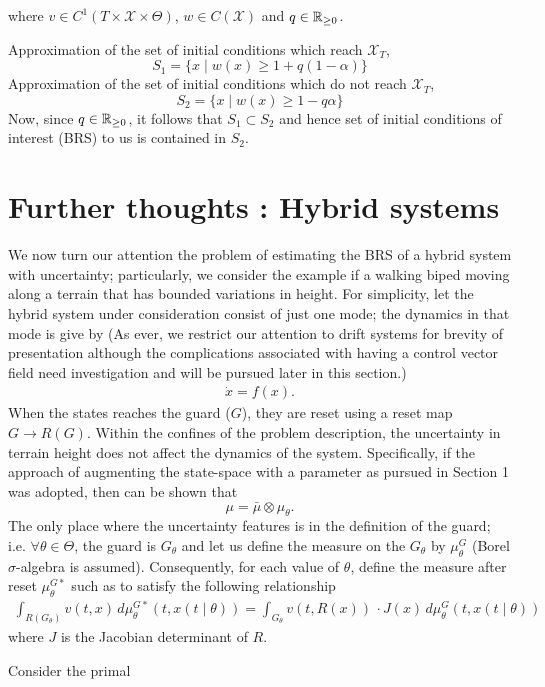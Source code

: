 \documentclass[10pt]{scrartcl}
\theoremstyle{remark}
\providecommand{\R}{\ensuremath \mathbb{R}}
\begin{document}
where $v\in C^1(T\times \mathcal X\times \Theta)$, $w\in C(\mathcal X)$ and $q\in \R_{\ge 0}$.\par
Approximation of the set of initial conditions which reach $\mathcal X_T$, 
$$S_1=\{x\mid w(x)\ge 1+q(1-\alpha)\}$$
Approximation of the set of initial conditions which do not reach $\mathcal X_T$, 
$$S_2=\{x\mid w(x)\ge 1-q\alpha\}$$
Now, since $q\in \R_{\ge 0}$, it follows that $S_1\subset S_2$ and hence set of initial conditions of interest (BRS) to us is contained in $S_2$.

\newpage

\section{Further thoughts : Hybrid systems}
We now turn our attention the problem of estimating the BRS of a hybrid system with uncertainty; particularly, we consider the example if a walking biped moving along a terrain that has bounded variations in height. For simplicity, let the hybrid system under consideration consist of just one mode; the dynamics in that mode is give by (As ever, we restrict our attention to drift systems for brevity of presentation although the complications associated with having a control vector field need investigation and will be pursued later in this section.)
\begin{align}
\dot x=f(x).
\end{align}
When the states reaches the guard ($G$), they are reset using a reset map $G\rightarrow R(G)$. Within the confines of the problem description, the uncertainty in terrain height does not affect the dynamics of the system. Specifically, if the approach of augmenting the state-space with a parameter as pursued in Section 1 was adopted, then can be shown that $$\mu=\bar\mu\otimes \mu_\theta.$$
The only place where the uncertainty features is in the definition of the guard; i.e. $\forall \theta\in \Theta$, the guard is $G_\theta$ and let us define the measure on the $G_\theta$ by $\mu^G_\theta$ (Borel $\sigma$-algebra is assumed). Consequently, for each value of $\theta$, define the measure after reset $\mu^{G*}_{\theta}$ such as to satisfy the following relationship
\begin{align}
	\int_{R(G_\theta)} v(t,x)\,d\mu_{\theta}^{G*}(t,x(t\mid \theta))=\int_{G_\theta}v(t,R(x))\,\cdot J(x)\,d\mu_\theta^G(t,x(t\mid \theta))
\end{align}
where $J$ is the Jacobian determinant of $R$.
\par
Consider the primal
\end{document}
